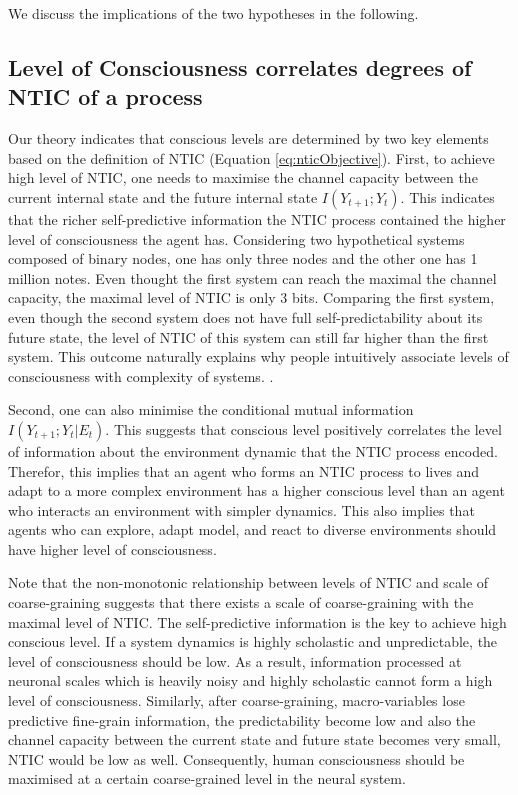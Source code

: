 		We discuss the implications of the two hypotheses in the following. 	
	    \subsection{Level of Consciousness correlates degrees of NTIC of a process}
	    
	    Our theory indicates that conscious levels are determined by two key elements based on the definition of NTIC (Equation \ref{eq:nticObjective}). First, to achieve high level of NTIC, one needs to maximise the channel capacity between the current internal state and the future internal state $I(Y_{t+1};Y_{t})$. This indicates that the richer self-predictive information the NTIC process contained the higher level of consciousness the agent has. Considering two hypothetical systems composed of binary nodes, one has only three nodes and the other one has 1 million notes. Even thought the first system can reach the maximal the channel capacity, the maximal level of NTIC is only 3 bits. Comparing the first system, even though the second system does not have full self-predictability about its future state, the level of NTIC of this system can still far higher than the first system. This outcome naturally explains why people intuitively associate levels of consciousness with complexity of systems. . 
	    
	    Second, one can also minimise the conditional mutual information  $I(Y_{t+1};Y_{t}|E_{t})$. This suggests that conscious level positively correlates the level of information about the environment dynamic that the NTIC process encoded. Therefor, this implies that an agent who forms an NTIC process to lives and adapt to a more complex environment has a higher conscious level than an agent who interacts an environment with simpler dynamics. This also implies that agents who can explore, adapt model, and react to diverse environments should have higher level of consciousness. 
	    
	    Note that the non-monotonic relationship between levels of NTIC and scale of coarse-graining suggests that there exists a scale of coarse-graining with the maximal level of NTIC. The self-predictive information is the key to achieve high conscious level. If a system dynamics is highly scholastic and unpredictable, the level of consciousness should be low. As a result, information processed at neuronal scales which is heavily noisy and highly scholastic cannot form a high level of consciousness. Similarly, after coarse-graining, macro-variables lose predictive fine-grain information, the predictability become low and also the channel capacity between the current state and future state becomes very small, NTIC would be low as well. Consequently, human consciousness should be maximised at a certain coarse-grained level in the neural system. 
	    
